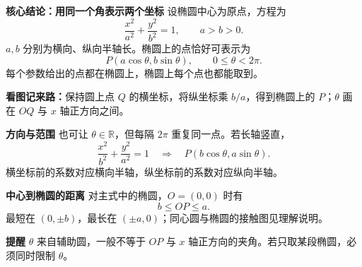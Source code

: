 \begin{statementbox}
\textbf{\textcolor{CStatement}{核心结论：用同一个角表示两个坐标}}
设椭圆中心为原点，方程为
\[
\frac{x^2}{a^2}+\frac{y^2}{b^2}=1,\qquad a>b>0.
\]
$a,b$ 分别为横向、纵向半轴长。椭圆上的点恰好可表示为
\[
\boxed{P(a\cos\theta,b\sin\theta),\qquad0\le\theta<2\pi.}
\]
每个参数给出的点都在椭圆上，椭圆上每个点也都能取到。



\textbf{看图记来路：}保持圆上点 $Q$ 的横坐标，将纵坐标乘 $b/a$，得到椭圆上的 $P$；$\theta$ 画在 $OQ$ 与 $x$ 轴正方向之间。

\tcbbreak
\textbf{\textcolor{CStatement}{方向与范围}}
也可让 $\theta\in\mathbb R$，但每隔 $2\pi$ 重复同一点。若长轴竖直，
\[
\frac{x^2}{b^2}+\frac{y^2}{a^2}=1
\quad\Longrightarrow\quad P(b\cos\theta,a\sin\theta).
\]
横坐标前的系数对应横向半轴，纵坐标前的系数对应纵向半轴。

\medskip
\textbf{\textcolor{CStatement}{中心到椭圆的距离}}
对主式中的椭圆，$O=(0,0)$ 时有
\[
\boxed{b\le OP\le a.}
\]
最短在 $(0,\pm b)$，最长在 $(\pm a,0)$；同心圆与椭圆的接触图见理解说明。

\medskip
\textbf{\textcolor{CStatement}{提醒}}
$\theta$ 来自辅助圆，一般不等于 $OP$ 与 $x$ 轴正方向的夹角。若只取某段椭圆，必须同时限制 $\theta$。
\end{statementbox}
